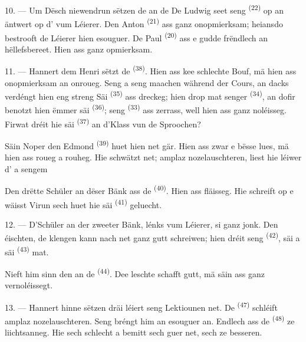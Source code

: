 10. --- Um Dësch niewendrun sëtzen de  an de 
De Ludwig seet seng  \textsuperscript{(22)} op an äntwert op
d' vum Léierer. Den Anton \textsuperscript{(21)} ass ganz onopmierksam;
heiansdo bestrooft de Léierer hien esouguer. De Paul \textsuperscript{(20)} ass e
gudde  frëndlech an hëllefsbereet. Hien ass ganz opmierksam.

\VUsaut{4.2mm}
\VUsaut{3.2mm}

11. --- Hannert dem Henri sëtzt de  \textsuperscript{(38)}. Hien ass
kee schlechte Bouf, mä hien ass  onopmierksam an onroueg. Seng
 a seng  maachen
 während der Cours, an dacks verdéngt hien eng streng
 Säi  \textsuperscript{(35)} ass dreckeg; hien
 drop mat senger  \textsuperscript{(34)}, an
dofir benotzt hien ëmmer säi  \textsuperscript{(36)}; seng
 \textsuperscript{(33)} ass zerrass, well hien ass ganz
noléisseg. Firwat dréit hie säi  \textsuperscript{(37)} an
d'Klass vun de  Sproochen?

Säin Noper den Edmond \textsuperscript{(39)} huet hien net gär. Hien ass zwar e bësse
lues, mä hien ass roueg a rouheg. Hie schwätzt net; amplaz nozelauschteren, liest hie
léiwer d' a sengem 

Den drëtte Schüler an dëser Bänk ass de  \textsuperscript{(40)}. Hien
ass fläisseg. Hie schreift op e wäisst  Virun sech huet hie säi
 \textsuperscript{(41)} geluecht.

12. --- D'Schüler an der zweeter Bänk, lénks vum Léierer, si ganz jonk. Den
éischten, de klengen  kann nach net ganz gutt schreiwen; hien dréit seng
 \textsuperscript{(42)}, säi  a säi
 \textsuperscript{(43)} mat.

Nieft him sinn den  an de  \textsuperscript{(44)}. Dee
leschte schafft gutt, mä säin  ass ganz vernoléissegt.

13. --- Hannert hinne sëtzen dräi  léiert seng
Lektiounen net. De  \textsuperscript{(47)} schléift amplaz
nozelauschteren. Seng  bréngt him  an esouguer
 an. Endlech ass de  \textsuperscript{(48)} ze
liichtsanneg. Hie  sech schlecht a bemitt sech guer net, sech ze
besseren.

